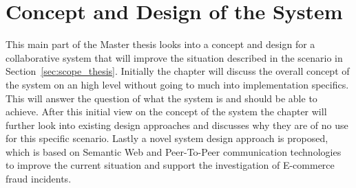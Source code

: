 
\chapter{Concept and Design of the System} %
\label{cha:design_system}

This main part of the Master thesis looks into a concept and design for a collaborative system that will improve the situation described in the scenario in Section~\ref{sec:scope_thesis}. Initially the chapter will discuss the overall concept of the system on an high level without going to much into implementation specifics. This will answer the question of what the system is and should be able to achieve. After this initial view on the concept of the system the chapter will further look into existing design approaches and discusses why they are of no use for this specific scenario. Lastly a novel system design approach is proposed, which is based on Semantic Web and Peer-To-Peer communication technologies to improve the current situation and support the investigation of E-commerce fraud incidents.







